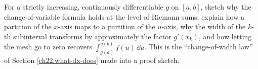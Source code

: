 \begin{exercise}
For a strictly increasing, continuously differentiable $g$ on $[a,b]$, sketch why
the change-of-variable formula holds at the level of Riemann sums: explain how a
partition of the $x$-axis maps to a partition of the $u$-axis, why the width of the
$k$-th subinterval transforms by approximately the factor $g'(x_k)$, and how letting
the mesh go to zero recovers $\int_{g(a)}^{g(b)} f(u)\,\dd u$. This is the
``change-of-width law'' of Section \ref{ch22:what-dx-does} made into a proof sketch.
\end{exercise}

